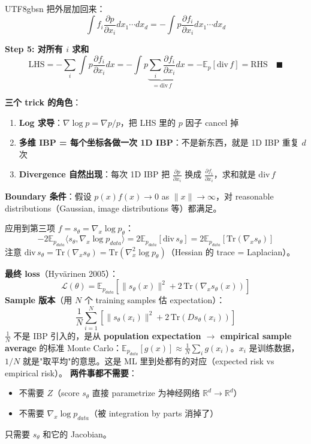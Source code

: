 \documentclass[11pt]{article}
\begin{document}
\begin{CJK}{UTF8}{gbsn}
把外层加回来：
\[
\int f_i \frac{\partial p}{\partial x_i} dx_1 \cdots dx_d = -\int p \frac{\partial f_i}{\partial x_i} dx_1 \cdots dx_d
\]

\textbf{Step 5: 对所有 $i$ 求和}
\[
\text{LHS} = -\sum_i \int p \frac{\partial f_i}{\partial x_i} dx = -\int p \underbrace{\sum_i \frac{\partial f_i}{\partial x_i}}_{= \text{div}\, f} dx = -\mathbb{E}_p[\text{div}\, f] = \text{RHS} \quad \blacksquare
\]

\textbf{三个 trick 的角色}：
\begin{enumerate}[nosep]
  \item \textbf{Log 求导}：$\nabla \log p = \nabla p / p$，把 LHS 里的 $p$ 因子 cancel 掉
  \item \textbf{多维 IBP = 每个坐标各做一次 1D IBP}：不是新东西，就是 1D IBP 重复 $d$ 次
  \item \textbf{Divergence 自然出现}：每次 1D IBP 把 $\frac{\partial p}{\partial x_i}$ 换成 $\frac{\partial f_i}{\partial x_i}$，求和就是 $\text{div}\, f$
\end{enumerate}

\textbf{Boundary 条件}：假设 $p(x) f(x) \to 0$ as $\|x\| \to \infty$，对 reasonable distributions（Gaussian, image distributions 等）都满足。

应用到第三项 $f = s_\theta = \nabla_x \log p_\theta$：
\[
-2 \mathbb{E}_{p_{data}}\langle s_\theta, \nabla_x \log p_{data}\rangle = 2 \mathbb{E}_{p_{data}}[\text{div}\, s_\theta] = 2 \mathbb{E}_{p_{data}}[\text{Tr}(\nabla_x s_\theta)]
\]
注意 $\text{div}\, s_\theta = \text{Tr}(\nabla_x s_\theta) = \text{Tr}(\nabla_x^2 \log p_\theta)$（Hessian 的 trace = Laplacian）。

\textbf{最终 loss}（Hyvärinen 2005）：
\[
  \boxed{\mathcal{L}(\theta) = \mathbb{E}_{p_{data}} \left[\|s_\theta(x)\|^2 + 2\,\text{Tr}(\nabla_x s_\theta(x))\right]}
\]
\textbf{Sample 版本}（用 $N$ 个 training samples 估 expectation）：
\[
  \frac{1}{N}\sum_{i=1}^N \left[\|s_\theta(x_i)\|^2 + 2\,\text{Tr}(D s_\theta(x_i))\right]
\]
$\frac{1}{N}$ 不是 IBP 引入的，是从 \textbf{population expectation $\to$ empirical sample average} 的标准 Monte Carlo：$\mathbb{E}_{p_{data}}[g(x)] \approx \frac{1}{N} \sum_i g(x_i)$。$x_i$ 是训练数据，$1/N$ 就是"取平均"的意思。这是 ML 里到处都有的对应（expected risk vs empirical risk）。
\textbf{两件事都不需要}：
\begin{itemize}[nosep]
  \item 不需要 $Z$（score $s_\theta$ 直接 parametrize 为神经网络 $\mathbb{R}^d \to \mathbb{R}^d$）
  \item 不需要 $\nabla_x \log p_{data}$（被 integration by parts 消掉了）
\end{itemize}
只需要 $s_\theta$ 和它的 Jacobian。


\end{CJK}
\end{document}
